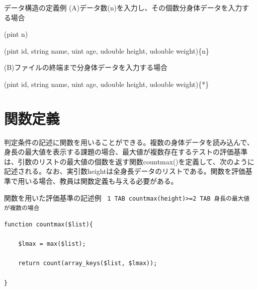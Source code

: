 \documentclass{tpu-sotu}
\begin{document}
\begin{minipage}[b]{1.025\textwidth}
\begin{itembox}[l]{データ構造の定義例}
(A)データ数(n)を入力し、その個数分身体データを入力する場合
{\tt

(pint n)

(pint id, string name, uint age, udouble height, udouble weight)\{n\}
}

(B)ファイルの終端まで分身体データを入力する場合
{\tt

(pint id, string name, uint age, udouble height, udouble weight)\{*\}
}

\end{itembox}
\end{minipage}

\section{関数定義}
判定条件の記述に関数を用いることができる。複数の身体データを読み込んで、身長の最大値を表示する課題の場合、最大値が複数存在するテストの評価基準は、引数のリストの最大値の個数を返す関数countmax()を定義して、次のように記述される。なお、実引数heightは全身長データのリストである。関数を評価基準で用いる場合、教員は関数定義も与える必要がある。

\begin{minipage}[b]{.8\textwidth}
\begin{itembox}[l]{関数を用いた評価基準の記述例}
{\tt
1 TAB countmax(height)>=2 TAB 身長の最大値が複数の場合
}
\end{itembox}
\end{minipage}
\begin{lstlisting}[caption = countmax 関数, basicstyle=\ttfamily\footnotesize, frame=single]
function countmax($list){

	$lmax = max($list);

	return count(array_keys($list, $lmax));

}
\end{lstlisting}
\end{document}
